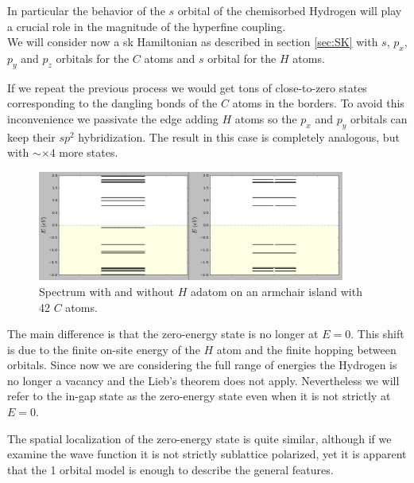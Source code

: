 In particular the behavior of the $s$ orbital of the chemisorbed Hydrogen will play a crucial role in the magnitude of the hyperfine coupling.\\

We will consider now a \ac{sk} Hamiltonian as described in section \ref{sec:SK} with $s$, $p_x$, $p_y$ and $p_z$ orbitals for the $C$ atoms and $s$ orbital for the $H$ atoms.

If we repeat the previous process we would get tons of close-to-zero states corresponding to the dangling bonds of the $C$ atoms in the borders. To avoid this inconvenience we passivate the edge adding $H$ atoms so the $p_x$ and $p_y$ orbitals can keep their $sp^2$ hybridization. The result in this case is completely analogous, but with $\sim\times4$ more states.\\

\begin{figure}[h!]
\centering
\includegraphics[width=0.9\textwidth]{chapter05/figures/spectrum4orb.png}
\vspace{-5pt}
\caption{Spectrum with and without $H$ adatom on an armchair island with 42 $C$ atoms.}
\label{spectrum4}
\end{figure}
\FloatBarrier

The main difference is that the zero-energy state is no longer at $E=0$. This shift is due to the finite on-site energy of the $H$ atom and the finite hopping between orbitals. Since now we are considering the full range of energies the Hydrogen is no longer a vacancy and the Lieb's theorem does not apply. Nevertheless we will refer to the in-gap state as the zero-energy state even when it is not strictly  at $E=0$.

The spatial localization of the zero-energy state is quite similar, although if we examine the wave function it is not strictly sublattice polarized, yet it is apparent that the 1 orbital model is enough to describe the general features.

